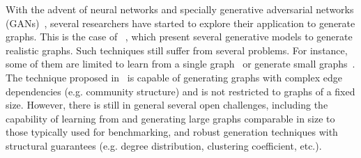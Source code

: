 With the advent of neural networks and specially generative adversarial networks
(GANs)~\cite{goodfellow2014generative}, several researchers have started to
explore their application to generate graphs. This is the case of
~\cite{kipf2016variational,grover2018graphite,simonovsky2018graphvae,li2018learning,you2018graphrnn},
which present several generative models to generate realistic graphs.  Such
techniques still suffer from several problems. For instance, some of them are
limited to learn from a single
graph~\cite{kipf2016variational,grover2018graphite} or generate small
graphs~\cite{simonovsky2018graphvae,li2018learning,you2018graphrnn}. The
technique proposed in~\cite{you2018graphrnn} is capable of generating graphs
with complex edge dependencies (e.g. community structure) and is not restricted
to graphs of a fixed size. However, there is still in general several open
challenges, including the capability of learning from and generating large graphs comparable
in size to those typically used for benchmarking, and robust generation
techniques with structural guarantees (e.g. degree distribution, clustering
coefficient, etc.).  


